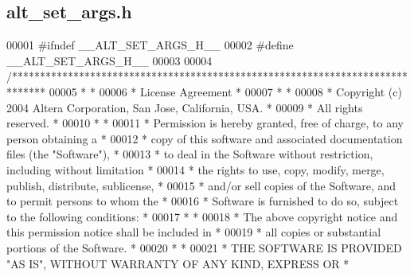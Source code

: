 \subsection{alt\+\_\+set\+\_\+args.\+h}
\label{alt__set__args_8h_source}

\begin{DoxyCode}
00001 \textcolor{preprocessor}{#ifndef \_\_ALT\_SET\_ARGS\_H\_\_}
00002 \textcolor{preprocessor}{#define \_\_ALT\_SET\_ARGS\_H\_\_}
00003 
00004 \textcolor{comment}{/******************************************************************************}
00005 \textcolor{comment}{*                                                                             *}
00006 \textcolor{comment}{* License Agreement                                                           *}
00007 \textcolor{comment}{*                                                                             *}
00008 \textcolor{comment}{* Copyright (c) 2004 Altera Corporation, San Jose, California, USA.           *}
00009 \textcolor{comment}{* All rights reserved.                                                        *}
00010 \textcolor{comment}{*                                                                             *}
00011 \textcolor{comment}{* Permission is hereby granted, free of charge, to any person obtaining a     *}
00012 \textcolor{comment}{* copy of this software and associated documentation files (the "Software"),  *}
00013 \textcolor{comment}{* to deal in the Software without restriction, including without limitation   *}
00014 \textcolor{comment}{* the rights to use, copy, modify, merge, publish, distribute, sublicense,    *}
00015 \textcolor{comment}{* and/or sell copies of the Software, and to permit persons to whom the       *}
00016 \textcolor{comment}{* Software is furnished to do so, subject to the following conditions:        *}
00017 \textcolor{comment}{*                                                                             *}
00018 \textcolor{comment}{* The above copyright notice and this permission notice shall be included in  *}
00019 \textcolor{comment}{* all copies or substantial portions of the Software.                         *}
00020 \textcolor{comment}{*                                                                             *}
00021 \textcolor{comment}{* THE SOFTWARE IS PROVIDED "AS IS", WITHOUT WARRANTY OF ANY KIND, EXPRESS OR  *}

\end{DoxyCode}
